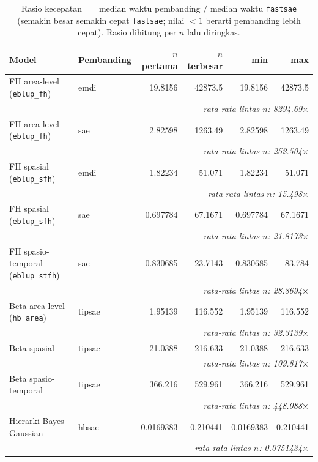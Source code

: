 \begin{table}[htbp]
\centering
\caption{Rasio kecepatan $=$ median waktu pembanding $/$ median waktu \texttt{fastsae} (semakin besar semakin cepat \texttt{fastsae}; nilai $<1$ berarti pembanding lebih cepat). Rasio dihitung per $n$ lalu diringkas.}
\label{tab:ratio}
\small
\begin{tabular}{llrrrr}
\toprule
Model & Pembanding & $n$ pertama & $n$ terbesar & min & max \\
\midrule
FH area-level (\texttt{eblup\_fh}) & emdi & 19.8156 & 42873.5 & 19.8156 & 42873.5 \\
 & \multicolumn{5}{r}{\emph{rata-rata lintas $n$: 8294.69$\times$}} \\[-2pt]
FH area-level (\texttt{eblup\_fh}) & sae & 2.82598 & 1263.49 & 2.82598 & 1263.49 \\
 & \multicolumn{5}{r}{\emph{rata-rata lintas $n$: 252.504$\times$}} \\[-2pt]
FH spasial (\texttt{eblup\_sfh}) & emdi & 1.82234 &  51.071 & 1.82234 &  51.071 \\
 & \multicolumn{5}{r}{\emph{rata-rata lintas $n$:  15.498$\times$}} \\[-2pt]
FH spasial (\texttt{eblup\_sfh}) & sae & 0.697784 & 67.1671 & 0.697784 & 67.1671 \\
 & \multicolumn{5}{r}{\emph{rata-rata lintas $n$: 21.8173$\times$}} \\[-2pt]
FH spasio-temporal (\texttt{eblup\_stfh}) & sae & 0.830685 & 23.7143 & 0.830685 &  83.784 \\
 & \multicolumn{5}{r}{\emph{rata-rata lintas $n$: 28.8694$\times$}} \\[-2pt]
Beta area-level (\texttt{hb\_area}) & tipsae & 1.95139 & 116.552 & 1.95139 & 116.552 \\
 & \multicolumn{5}{r}{\emph{rata-rata lintas $n$: 32.3139$\times$}} \\[-2pt]
Beta spasial & tipsae & 21.0388 & 216.633 & 21.0388 & 216.633 \\
 & \multicolumn{5}{r}{\emph{rata-rata lintas $n$: 109.817$\times$}} \\[-2pt]
Beta spasio-temporal & tipsae & 366.216 & 529.961 & 366.216 & 529.961 \\
 & \multicolumn{5}{r}{\emph{rata-rata lintas $n$: 448.088$\times$}} \\[-2pt]
Hierarki Bayes Gaussian & hbsae & 0.0169383 & 0.210441 & 0.0169383 & 0.210441 \\
 & \multicolumn{5}{r}{\emph{rata-rata lintas $n$: 0.0751434$\times$}} \\[-2pt]
\bottomrule
\end{tabular}
\end{table}

